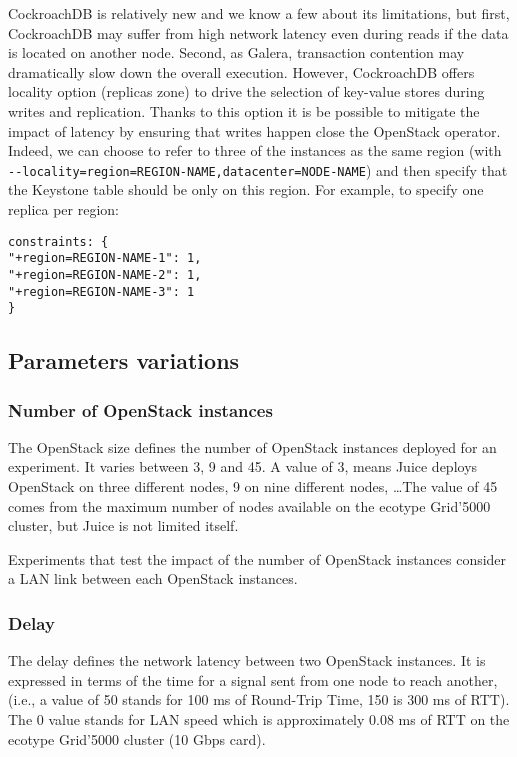 CockroachDB is relatively new and we know a few about its limitations, but first, CockroachDB may suffer from high network latency even during reads if the data is located on another node. Second, as Galera, transaction contention may dramatically slow down the overall execution. However, CockroachDB offers locality option (replicas zone) to drive the selection of key-value stores during writes and replication. Thanks to this option it is be possible to mitigate the impact of latency by ensuring that writes happen close the OpenStack operator. Indeed, we can choose to refer to three of the instances as the same region (with \verb+--locality=region=REGION-NAME,datacenter=NODE-NAME+) and then specify that the Keystone table should be only on this region. For example, to specify one replica per region:
\begin{verbatim}
constraints: {
"+region=REGION-NAME-1": 1,
"+region=REGION-NAME-2": 1,
"+region=REGION-NAME-3": 1
}
\end{verbatim}

\subsection{Parameters variations}
\label{subsec:param}
\subsubsection{Number of OpenStack instances}

The OpenStack size defines the number of OpenStack instances deployed for an experiment. It varies between 3, 9 and 45. A value of 3, means Juice deploys OpenStack on three different nodes, 9 on nine different nodes, \dots The value of 45 comes from the maximum number of nodes available on the ecotype Grid’5000 cluster, but Juice is not limited itself.


Experiments that test the impact of the number of OpenStack instances consider a LAN link between each OpenStack instances.

\subsubsection{Delay}

The delay defines the network latency between two OpenStack instances. It is expressed in terms of the time for a signal sent from one node to reach another, (i.e., a value of 50 stands for 100 ms of Round-Trip Time, 150 is 300 ms of RTT). The 0 value stands for LAN speed which is approximately 0.08 ms of RTT on the ecotype Grid’5000 cluster (10 Gbps card).


